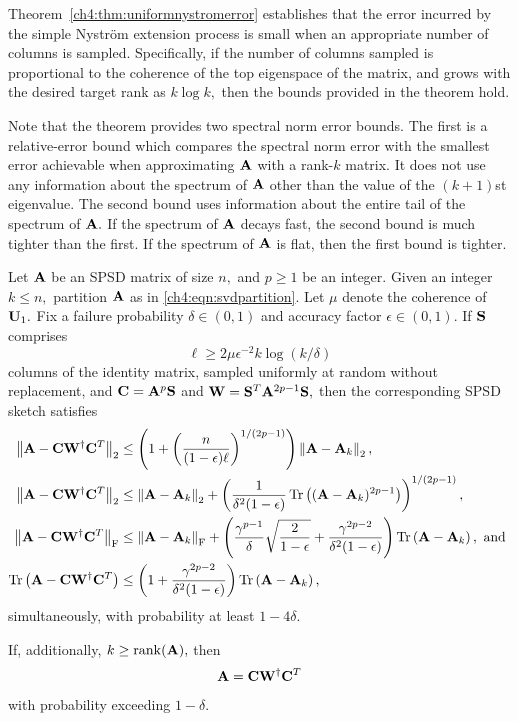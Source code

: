 Theorem~\ref{ch4:thm:uniformnystromerror} establishes that the error incurred by the
simple Nystr\"om extension process is small when an appropriate number of
columns is sampled. Specifically, if the number of columns sampled is proportional
to the coherence of the top eigenspace of the matrix, and grows with the desired
target rank as $k \log k,$ then the bounds provided in the theorem hold.

Note that the theorem provides two spectral norm error bounds. The first is a
relative-error bound which compares the spectral norm error with the smallest 
error achievable when approximating $\mathbf{A}$ with a rank-$k$ matrix.
It does not use any information about the spectrum of $\mathbf{A}$ other than the
value of the $(k+1)$st eigenvalue. The second bound uses information about the
entire tail of the spectrum of $\mathbf{A}.$ If the spectrum of $\mathbf{A}$ decays
fast, the second bound is much tighter than the first. If the spectrum of
$\mathbf{A}$ is flat, then the first bound is tighter.

\begin{thm}
 Let $\mathbf{A}$ be an SPSD matrix of size $n,$ and $p \geq 1$ be an integer. Given an integer $k \leq n,$
partition $\mathbf{A}$ as in \eqref{ch4:eqn:svdpartition}. Let
$\mu$ denote the coherence of $\mathbf{U}_1.$ Fix a failure probability $\delta \in
(0,1)$ and accuracy factor $\epsilon \in (0,1).$  If $\mathbf{S}$ comprises
\[
\ell \geq 2 \mu \epsilon^{-2} k \log(k/\delta)
\]
columns of the identity matrix, sampled uniformly at random without replacement, 
and $\mathbf{C} = \mathbf{A}^p \mathbf{S}$ and $\mathbf{W} = \mathbf{S}^T \mathbf{A}^{2p-1} \mathbf{S},$ then
the corresponding SPSD sketch satisfies
 \begin{align*}
  \left\|\mathbf{A} - \mathbf{C} \mathbf{W}^\dagger \mathbf{C}^T\right\|_2 & \leq  \left(1 + \left(\frac{n}{(1-\epsilon)\ell}\right)^{1/(2p-1)} \right) \left\|\mathbf{A} - \mathbf{A}_k\right\|_2 , \\
  \left\|\mathbf{A} - \mathbf{C} \mathbf{W}^\dagger \mathbf{C}^T\right\|_2 & \leq
\left\|\mathbf{A} - \mathbf{A}_k\right\|_2 + \left( \frac{1}{\delta^2 (1 - \epsilon)} \operatorname{Tr}\left((\mathbf{A} - \mathbf{A}_k)^{2p-1}\right) \right)^{1/(2p-1)}, \\
 \left\|\mathbf{A} - \mathbf{C} \mathbf{W}^\dagger \mathbf{C}^T\right\|_\mathrm{F} & \leq 
   \left\|\mathbf{A} - \mathbf{A}_k\right\|_\mathrm{F} + \left(\frac{\gamma^{p-1}}{\delta} \sqrt{\frac{2}{1-\epsilon}} 
             + \frac{\gamma^{2p-2}}{\delta^2(1-\epsilon)} \right) \operatorname{Tr}\left(\mathbf{A} - \mathbf{A}_k\right), \text{ and } \\
  \operatorname{Tr}\left(\mathbf{A} - \mathbf{C} \mathbf{W}^\dagger \mathbf{C}^T\right) & \leq 
  \left(1 + \frac{\gamma^{2p-2}}{\delta^2 (1-\epsilon)} \right) \operatorname{Tr}\left(\mathbf{A} - \mathbf{A}_k\right),
\end{align*}
simultaneously, with probability at least $1 - 4\delta.$

If, additionally, $k \geq \mathrm{rank}(\mathbf{A}),$ then
\[
 \mathbf{A} = \mathbf{C} \mathbf{W}^\dagger \mathbf{C}^T
\]
with probability exceeding $1-\delta.$

\label{ch4:thm:uniformnystromerror}
\end{thm}

